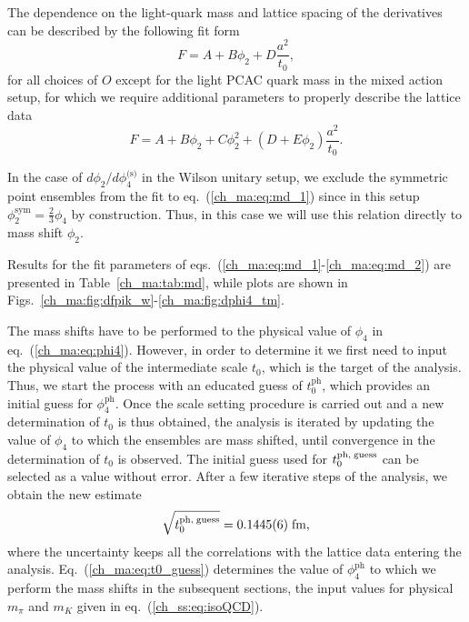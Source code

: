 The dependence on the light-quark mass and lattice spacing of the derivatives can be described by the following fit form
\begin{equation}
\label{ch_ma:eq:md_1}
F=A+B\phi_2+D\frac{a^2}{t_0},
\end{equation}
for all choices of ${O}$ except for the light PCAC quark mass in the mixed action setup, for which we require additional parameters to properly describe the lattice data
\begin{equation}
\label{ch_ma:eq:md_2}
F=A+B\phi_2+C\phi_2^2+(D+E\phi_2)\frac{a^2}{t_0}.
\end{equation}

In the case of $d\phi_2/d\phi_4^{\textrm{(s)}}$ in the Wilson unitary setup, we exclude the symmetric point ensembles from the fit to eq.~(\ref{ch_ma:eq:md_1}) since in this setup $\phi_2^{\textrm{sym}}=\frac{2}{3}\phi_4$ by construction. Thus, in this case we will use this relation directly to mass shift $\phi_2$.

Results for the fit parameters of eqs.~(\ref{ch_ma:eq:md_1}-\ref{ch_ma:eq:md_2}) are presented in Table~\ref{ch_ma:tab:md}, while plots are shown in Figs.~\ref{ch_ma:fig:dfpik_w}-\ref{ch_ma:fig:dphi4_tm}.

The mass shifts have to be performed to the physical value of $\phi_4$ in eq.~(\ref{ch_ma:eq:phi4}). However, in order to determine it we first need to input the physical value of the intermediate scale $t_0$, which is the target of the analysis. Thus, we start the process with an educated guess of $t_0^{\textrm{ph}}$, which provides an initial guess for $\phi_4^{\textrm{ph}}$. Once the scale setting procedure is carried out and a new determination of $t_0$ is thus obtained, the analysis is iterated by updating the value of $\phi_4$ to which the ensembles are mass shifted, until convergence in the determination of $t_0$ is observed. The initial guess used for $t_0^{\textrm{ph,\;guess}}$ can be selected as a value without error. After a few iterative steps of the analysis, we obtain the new estimate
\begin{equation}
\label{ch_ma:eq:t0_guess}
\sqrt{t_0^{\textrm{ph,\;guess}}}=0.1445(6)\;\textrm{fm},
\end{equation}
where the uncertainty keeps all the correlations with the lattice data entering the analysis. Eq.~(\ref{ch_ma:eq:t0_guess}) determines the value of $\phi_4^{\textrm{ph}}$ to which we perform the mass shifts in the subsequent sections, the input values for physical $m_{\pi}$ and $m_K$ given in eq.~(\ref{ch_ss:eq:isoQCD}). 

